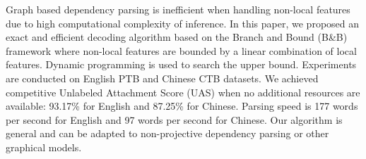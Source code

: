Graph based dependency parsing is inefficient when handling non-local features due to high computational complexity of inference. In this paper, we proposed
 an exact and efficient decoding algorithm based on the Branch and Bound (B\&B)
 framework where non-local features are bounded by a linear combination of local
 features. Dynamic programming is used to search the upper bound. Experiments
 are conducted on English PTB and Chinese CTB datasets. We achieved competitive
 Unlabeled Attachment Score (UAS) when no additional resources are available:
 93.17\% for English and 87.25\% for Chinese. Parsing speed is 177 words per
 second for English and 97 words per second for Chinese. Our algorithm is
 general and can be adapted to non-projective dependency parsing or other
 graphical models.

